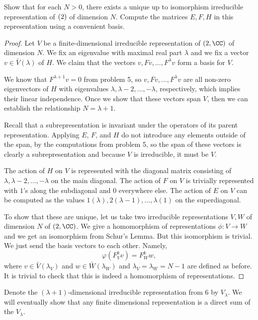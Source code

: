 \documentclass{article}
\begin{document}
\begin{prb}
Show that for each $N > 0$, there exists a unique up to isomorphism irreducible
representation of $\sl(2)$ of dimension $N$. Compute the matrices $E, F, H$ in
this representation using a convenient basis.
\end{prb}

\begin{proof}
Let $V$ be a finite-dimensional irreducible representation of $\sl(2, \CC)$ of
dimension $N$. We fix an eigenvalue with maximal real part $\lambda$ and we fix
a vector $v \in \bar{V}(\lambda)$ of $H$. We claim that the vectors $v, Fv,
\dots, F^{\lambda} v$ form a basis for $V$.

We know that $F^{\lambda + 1} v = 0$ from problem 5, so $v, Fv, \dots,
F^{\lambda} v$ are all non-zero eigenvectors of $H$ with eigenvalues $\lambda,
\lambda - 2, \dots, -\lambda$, respectively, which implies their linear
independence. Once we show that these vectors span $V$, then we can establish
the relationship $N = \lambda + 1$.

Recall that a subrepresentation is invariant under the operators of its parent
representation. Applying $E$, $F$, and $H$ do not introduce any elements outside
of the span, by the computations from problem 5, so the span of these vectors is
clearly a subrepresentation and because $V$ is irreducible, it must be $V$.

The action of $H$ on $V$ is represented with the diagonal matrix consisting of
$\lambda, \lambda - 2, \dots, -\lambda$ on the main diagonal. The action of $F$
on $V$ is trivially represented with $1$'s along the subdiagonal and $0$
everywhere else. The action of $E$ on $V$ can be computed as the values $1
(\lambda), 2 (\lambda - 1), \dots, \lambda (1)$ on the superdiagonal.

To show that these are unique, let us take two irreducible representations $V,
W$ of dimension $N$ of $\sl(2, \CC)$. We give a homomorphism of representations
$\phi : V \to W$ and we get an isomorphism from Schur's Lemma. But this
isomorphism is trivial.  We just send the basis vectors to each other. Namely,
\[ \varphi(F_V^k v) = F_W^k w, \]
where $v \in \bar{V}(\lambda_V)$ and $w \in \bar{W}(\lambda_W)$ and $\lambda_V =
\lambda_W = N - 1$ are defined as before. It is trivial to check that this is
indeed a homomorphism of representations.
\end{proof}

Denote the $(\lambda + 1)$-dimensional irreducible representation from 6 by
$V_{\lambda}$. We will eventually show that any finite dimensional
representation is a direct sum of the $V_{\lambda}$.
\end{document}
